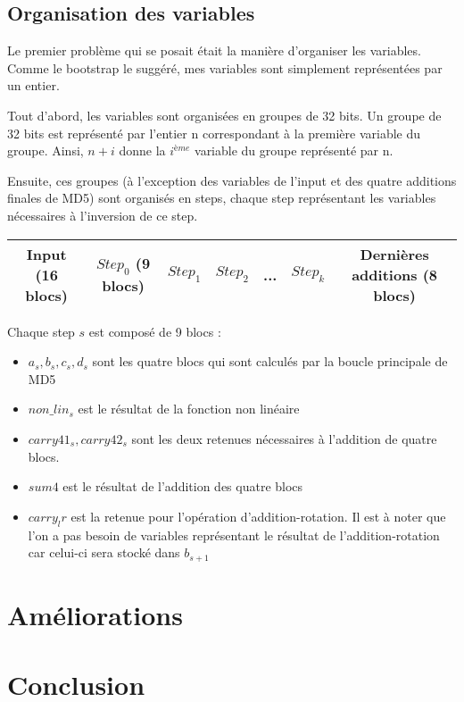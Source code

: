 \documentclass{article}
\begin{document}
\subsection{Organisation des variables}
Le premier problème qui se posait était la manière d'organiser les variables. Comme le bootstrap le suggéré, mes variables sont simplement représentées par un entier. \par
Tout d'abord, les variables sont organisées en groupes de 32 bits. Un groupe de 32 bits est représenté par l'entier n correspondant à la première variable du groupe. Ainsi, $n + i$ donne la $i^{ème}$ variable du groupe représenté par n. \par
Ensuite, ces groupes (à l'exception des variables de l'input et des quatre additions finales de MD5) sont organisés en steps, chaque step représentant les variables nécessaires à l'inversion de ce step.
\newline

\begin{tabular}{|c|c|c|c|c|c|c|}
   \hline
   Input (16 blocs) & $Step_0$ (9 blocs) & $Step_1$ & $Step_2$ & ... & $Step_k$ & Dernières additions (8 blocs) \\
   \hline
\end{tabular}
\newline
\par
Chaque step $s$ est composé de 9 blocs : 
\begin{itemize}
\item $a_s,b_s,c_s,d_s$ sont les quatre blocs qui sont calculés par la boucle principale de MD5
\item $non\_lin_s$ est le résultat de la fonction non linéaire
\item $carry41_s, carry42_s$ sont les deux retenues nécessaires à l'addition de quatre blocs.
\item $sum4$ est le résultat de l'addition des quatre blocs
\item $carry_lr$ est la retenue pour l'opération d'addition-rotation. Il est à noter que l'on a pas besoin de variables représentant le résultat de l'addition-rotation car celui-ci sera stocké dans $b_{s+1}$
\end{itemize}


\section{Améliorations}

\section{Conclusion}
\end{document}

